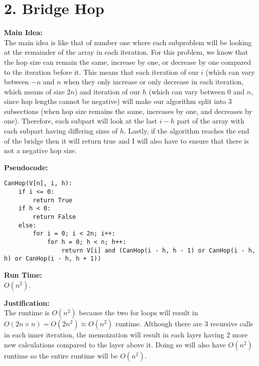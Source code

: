 \documentclass[11pt]{article}
\newenvironment{mainIdea}{\par{\bf Main Idea:}}{\smallskip}
\newenvironment{pseudocode}{\par{\bf Pseudocode:}}{\smallskip}
\newenvironment{runTime}{\par{\bf Run Time:}}{\smallskip}
\newenvironment{justification}{\par{\bf Justification:}}{\smallskip}
\begin{document}
\section*{2. Bridge Hop}
\begin{mainIdea}
\\
The main idea is like that of number one where each subproblem will be looking at the remainder of the array in each iteration. For this problem, we know that the hop size can remain the same, increase by one, or decrease by one compared to the iteration before it. This means that each iteration of our $i$ (which can vary between $-n$ and $n$ when they only increase or only decrease in each iteration, which means of size $2n$) and iteration of our $h$ (which can vary between $0$ and $n$, since hop lengths cannot be negative) will make our algorithm split into $3$ subsections (when hop size remains the same, increases by one, and decreases by one). Therefore, each subpart will look at the last $i - h$ part of the array with each subpart having differing sizes of $h$. Lastly, if the algorithm reaches the end of the bridge then it will return true and I will also have to ensure that there is not a negative hop size.
\end{mainIdea}
\\
\begin{pseudocode}
\begin{lstlisting}
CanHop(V[n], i, h):
	if i <= 0:
		return True
	if h < 0:
		return False
	else:
		for i = 0; i < 2n; i++:
			for h = 0; h < n; h++:
				return V[i] and (CanHop(i - h, h - 1) or CanHop(i - h, h) or CanHop(i - h, h + 1))
\end{lstlisting}
\end{pseudocode}
\begin{runTime}
\\
$O(n^2)$.
\end{runTime}
\\
\begin{justification}
\\
The runtime is $O(n ^ 2)$ because the two for loops will result in $O(2n \times n) = O(2n ^ 2) \approx O(n ^ 2)$ runtime. Although there are $3$ recursive calls in each inner iteration, the memoization will result in each layer having $2$ more new calculations compared to the layer above it. Doing so will also have $O(n ^ 2)$ runtime so the entire runtime will be $O(n ^ 2)$.
\end{justification}



\newpage
\end{document}
